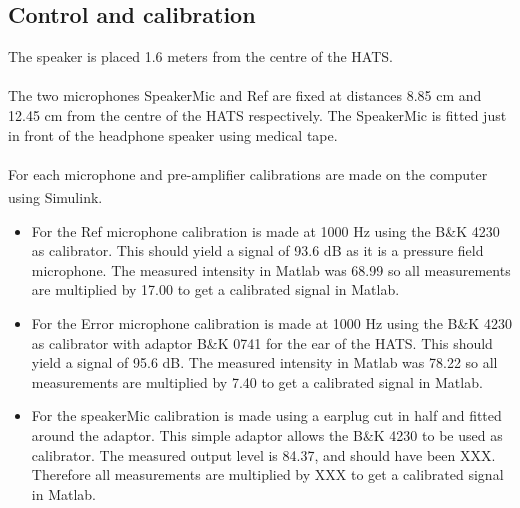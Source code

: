\subsection{Control and calibration}
The speaker is placed 1.6 meters from the centre of the HATS. \\\\
The two microphones SpeakerMic and Ref are fixed at distances 8.85 cm and 12.45 cm from the centre of the HATS respectively. The SpeakerMic is fitted just in front of the headphone speaker using medical tape.\\\\
For each microphone and pre-amplifier calibrations are made on the computer using Simulink\textsuperscript{\textregistered}.
\begin{itemize}
	\item For the Ref microphone calibration is made at 1000 Hz using the B\&K 4230 as calibrator. This should yield a signal of 93.6 dB as it is a pressure field microphone. The measured intensity in Matlab was 68.99 so all measurements are multiplied by 17.00 to get a calibrated signal in Matlab. 
	\item For the Error microphone calibration is made at 1000 Hz using the B\&K 4230 as calibrator with adaptor B\&K 0741 for the ear of the HATS. This should yield a signal of 95.6 dB. The measured intensity in Matlab was 78.22 so all measurements are multiplied by 7.40 to get a calibrated signal in Matlab. 
	\item For the speakerMic calibration is made using a earplug cut in half and fitted around the adaptor. This simple adaptor allows the B\&K 4230 to be used as calibrator. The measured output level is 84.37, and should have been XXX. Therefore all measurements are multiplied by XXX to get a calibrated signal in Matlab. 
\end{itemize}
 
